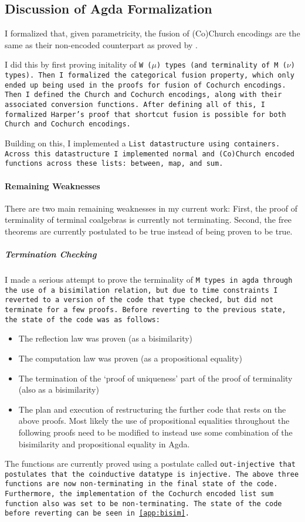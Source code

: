 
\subsection{Discussion of Agda Formalization}\label{sec:agda_form_disc}
I formalized that, given parametricity, the fusion of (Co)Church encodings are the same as their non-encoded counterpart as proved by \cite{Harper2011}.

I did this by first proving initality of \tt{W} ($\mu$) types (and terminality of \tt{M} ($\nu$) types).
Then I formalized the categorical fusion property, which only ended up being used in the proofs for fusion of Cochurch encodings.
Then I defined the Church and Cochurch encodings, along with their associated conversion functions.
After defining all of this, I formalized Harper's proof that shortcut fusion is possible for both Church and Cochurch encodings.

Building on this, I implemented a \tt{List} datastructure using containers.
Across this datastructure I implemented normal and (Co)Church encoded functions across these lists: \tt{between}, \tt{map}, and \tt{sum}.

\paragraph{Remaining Weaknesses}
There are two main remaining weaknesses in my current work:
First, the proof of terminality of terminal coalgebras is currently not terminating.
Second, the free theorems are currently postulated to be true instead of being proven to be true.

\subparagraph{Termination Checking}
I made a serious attempt to prove the terminality of \tt{M} types in agda through the use of a bisimilation relation, but due to time constraints I reverted to a version of the code that type checked, but did not terminate for a few proofs.
Before reverting to the previous state, the state of the code was as follows:
\begin{itemize}[noitemsep]
  \item The reflection law was proven (as a bisimilarity)
  \item The computation law was proven (as a propositional equality)
  \item The termination of the `proof of uniqueness' part of the proof of terminality (also as a bisimilarity)
  \item The plan and execution of restructuring the further code that rests on the above proofs.
  Most likely the use of propositional equalities throughout the following proofs need to be modified to instead use some combination of the bisimilarity and propositional equality in Agda.
\end{itemize}
The functions are currently proved using a postulate called \tt{out-injective} that postulates that the coinductive datatype is injective.
The above three functions are now non-terminating in the final state of the code.
Furthermore, the implementation of the Cochurch encoded list \tt{sum} function also was set to be non-terminating.
The state of the code before reverting can be seen in \autoref{app:bisim}.

